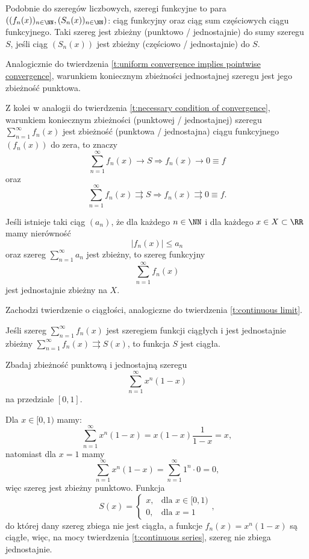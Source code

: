 Podobnie do szeregów liczbowych, szeregi funkcyjne to para $((f_n(x))_{n\in\NN}, (S_n(x))_{n\in\NN})$: ciąg funkcyjny oraz ciąg sum częściowych ciągu funkcyjnego. Taki szereg jest zbieżny (punktowo / jednostajnie) do sumy szeregu $S$, jeśli ciąg $(S_n(x))$ jest zbieżny (częściowo / jednostajnie) do $S$.

Analogicznie do twierdzenia \ref{t:uniform convergence implies pointwise convergence}, warunkiem koniecznym zbieżności jednostajnej szeregu jest jego zbieżność punktowa.

Z kolei w analogii do twierdzenia \ref{t:necessary condition of convergence}, warunkiem koniecznym zbieżności (punktowej / jednostajnej) szeregu $\sum_{n=1}^\infty f_n(x)$ jest zbieżność (punktowa / jednostajna) ciągu funkcyjnego $(f_n(x))$ do zera, to znaczy
\[ \sum_{n=1}^\infty f_n(x) \rightarrow S \Longrightarrow f_n(x) \rightarrow 0 \equiv f \]
oraz
\[ \sum_{n=1}^\infty f_n(x) \rightrightarrows S \Longrightarrow f_n(x) \rightrightarrows 0 \equiv f. \]

\begin{theorem}
    Jeśli istnieje taki ciąg $(a_n)$, że dla każdego $n \in \NN$ i dla każdego $x \in X \subset \RR$ mamy nierówność
    \[ |f_n(x)| \leq a_n \]
    oraz szereg $\sum_{n=1}^\infty a_n$ jest zbieżny, to szereg funkcyjny
    \[ \sum_{n=1}^\infty f_n(x) \]
    jest jednostajnie zbieżny na $X$.
\end{theorem}

Zachodzi twierdzenie o ciągłości, analogiczne do twierdzenia \ref{t:continuous limit}.

\begin{theorem}
    \label{t:continuous series}
    Jeśli szereg $\sum_{n=1}^\infty f_n(x)$ jest szeregiem funkcji ciągłych i jest jednostajnie zbieżny $\sum_{n=1}^\infty f_n(x) \rightrightarrows S(x)$, to funkcja $S$ jest ciągła.
\end{theorem}

\begin{example}
    Zbadaj zbieżność punktową i jednostajną szeregu
    \[ \sum_{n=1}^\infty x^n(1-x) \]
    na przedziale $[0,1]$.
\end{example}
\begin{solution}
    Dla $x \in [0, 1)$ mamy:
    \[ \sum_{n=1}^\infty x^n(1-x) = x(1-x)\frac{1}{1-x} = x, \]
    natomiast dla $x = 1$ mamy
    \[ \sum_{n=1}^\infty x^n(1-x) = \sum_{n=1}^\infty 1^n \cdot 0 = 0, \]
    więc szereg jest zbieżny punktowo. Funkcja
    \[ S(x) = \begin{cases}x, & \text{dla } x \in [0, 1) \\ 0, & \text{dla } x = 1 \end{cases}, \]
    do której dany szereg zbiega nie jest ciągła, a funkcje $f_n(x) = x^n(1-x)$ są ciągłe, więc, na mocy twierdzenia \ref{t:continuous series}, szereg nie zbiega jednostajnie.
\end{solution}

